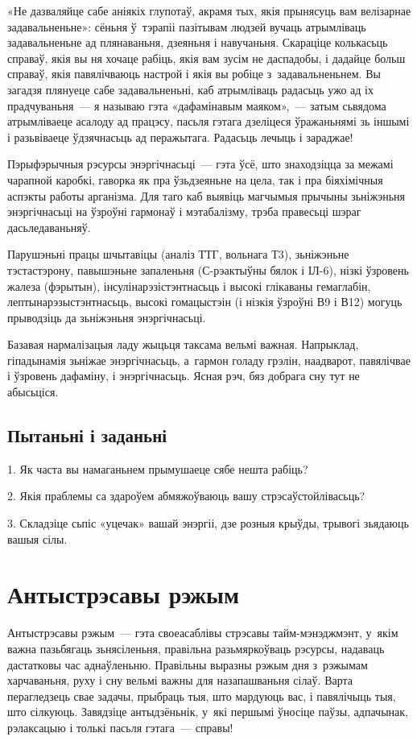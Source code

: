 «Не дазваляйце сабе аніякіх глупотаў, акрамя тых, якія прынясуць вам велізарнае задавальненьне»: сёньня ў~тэрапіі пазітывам людзей вучаць атрымліваць задавальненьне ад плянаваньня, дзеяньня і навучаньня. Скараціце колькасьць справаў, якія вы ня хочаце рабіць, якія вам зусім не даспадобы, і дадайце больш справаў, якія павялічваюць настрой і якія вы робіце з~задавальненьнем. Вы загадзя плянуеце сабе задавальненьні, каб атрымліваць радасьць ужо ад іх прадчуваньня~--- я называю гэта «дафамінавым маяком»,~--- затым сьвядома атрымліваеце асалоду ад працэсу, пасьля гэтага дзеліцеся ўражаньнямі зь іншымі і разьвіваеце ўдзячнасьць ад перажытага. Радасьць лечыць і зараджае!

Пэрыфэрычныя рэсурсы энэргічнасьці~--- гэта ўсё, што знаходзіцца за межамі чарапной каробкі, гаворка як пра ўзьдзеяньне на цела, так і пра біяхімічныя аспэкты работы арганізма. Для таго каб выявіць магчымыя прычыны зьніжэньня энэргічнасьці на ўзроўні гармонаў і мэтабалізму, трэба правесьці шэраг дасьледаваньняў.

Парушэньні працы шчытавіцы (аналіз ТТГ, вольнага Т3), зьніжэньне тэстастэрону, павышэньне запаленьня (С-рэактыўны бялок і ІЛ-6), нізкі ўзровень жалеза (фэрытын), інсулінарэзістэнтнасьць і высокі глікаваны гемаглабін, лептынарэзыстэнтнасьць, высокі гомацыстэін (і нізкія ўзроўні В9 і В12) могуць прыводзіць да зьніжэньня энэргічнасьці.

Базавая нармалізацыя ладу жыцьця таксама вельмі важная. Напрыклад, гіпадынамія зьніжае энэргічнасьць, а~гармон голаду грэлін, наадварот, павялічвае і ўзровень дафаміну, і энэргічнасьць. Ясная рэч, бяз добрага сну тут не абысьціся.

\subsection*{Пытаньні і заданьні}

1. Як часта вы намаганьнем прымушаеце сябе нешта рабіць?

2. Якія праблемы са здароўем абмяжоўваюць вашу стрэсаўстойлівасьць?

3. Складзіце сьпіс «уцечак» вашай энэргіі, дзе розныя крыўды, трывогі зьядаюць вашыя сілы.


\section{Антыстрэсавы рэжым}

Антыстрэсавы рэжым~--- гэта своеасаблівы стрэсавы тайм-мэнэджмэнт, у~якім важна пазьбягаць зьнясіленьня, правільна разьмяркоўваць рэсурсы, надаваць дастатковы час аднаўленьню. Правільны выразны рэжым дня з~рэжымам харчаваньня, руху і сну вельмі важны для назапашваньня сілаў. Варта перагледзець свае задачы, прыбраць тыя, што мардуюць вас, і павялічыць тыя, што сілкуюць. Завядзіце антыдзёньнік, у~які першымі ўносіце паўзы, адпачынак, рэлаксацыю і толькі пасьля гэтага~--- справы!

